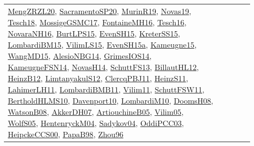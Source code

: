 {\begin{longtable}{lp{3cm}>{\raggedright}p{6cm}>{\raggedright}p{6cm}p{8cm}}
\href{articles/MengZRZL20.pdf}{MengZRZL20}\cite{MengZRZL20}, \href{articles/SacramentoSP20.pdf}{SacramentoSP20}\cite{SacramentoSP20}, \href{papers/MurinR19.pdf}{MurinR19}\cite{MurinR19}, \href{articles/Novas19.pdf}{Novas19}\cite{Novas19}, \href{papers/Tesch18.pdf}{Tesch18}\cite{Tesch18}, \href{papers/MossigeGSMC17.pdf}{MossigeGSMC17}\cite{MossigeGSMC17}, \href{papers/FontaineMH16.pdf}{FontaineMH16}\cite{FontaineMH16}, \href{papers/Tesch16.pdf}{Tesch16}\cite{Tesch16}, \href{articles/NovaraNH16.pdf}{NovaraNH16}\cite{NovaraNH16}, \href{papers/BurtLPS15.pdf}{BurtLPS15}\cite{BurtLPS15}, \href{papers/EvenSH15.pdf}{EvenSH15}\cite{EvenSH15}, \href{papers/KreterSS15.pdf}{KreterSS15}\cite{KreterSS15}, \href{papers/LombardiBM15.pdf}{LombardiBM15}\cite{LombardiBM15}, \href{papers/VilimLS15.pdf}{VilimLS15}\cite{VilimLS15}, \href{articles/EvenSH15a.pdf}{EvenSH15a}\cite{EvenSH15a}, \href{articles/Kameugne15.pdf}{Kameugne15}\cite{Kameugne15}, \href{articles/WangMD15.pdf}{WangMD15}\cite{WangMD15}, \href{papers/AlesioNBG14.pdf}{AlesioNBG14}\cite{AlesioNBG14}, \href{articles/GrimesIOS14.pdf}{GrimesIOS14}\cite{GrimesIOS14}, \href{articles/KameugneFSN14.pdf}{KameugneFSN14}\cite{KameugneFSN14}, \href{articles/NovasH14.pdf}{NovasH14}\cite{NovasH14}, \href{papers/SchuttFS13.pdf}{SchuttFS13}\cite{SchuttFS13}, \href{papers/BillautHL12.pdf}{BillautHL12}\cite{BillautHL12}, \href{papers/HeinzB12.pdf}{HeinzB12}\cite{HeinzB12}, \href{articles/LimtanyakulS12.pdf}{LimtanyakulS12}\cite{LimtanyakulS12}, \href{papers/ClercqPBJ11.pdf}{ClercqPBJ11}\cite{ClercqPBJ11}, \href{papers/HeinzS11.pdf}{HeinzS11}\cite{HeinzS11}, \href{papers/LahimerLH11.pdf}{LahimerLH11}\cite{LahimerLH11}, \href{papers/LombardiBMB11.pdf}{LombardiBMB11}\cite{LombardiBMB11}, \href{papers/Vilim11.pdf}{Vilim11}\cite{Vilim11}, \href{articles/SchuttFSW11.pdf}{SchuttFSW11}\cite{SchuttFSW11}, \href{papers/BertholdHLMS10.pdf}{BertholdHLMS10}\cite{BertholdHLMS10}, \href{papers/Davenport10.pdf}{Davenport10}\cite{Davenport10}, \href{papers/LombardiM10.pdf}{LombardiM10}\cite{LombardiM10}, \href{papers/DoomsH08.pdf}{DoomsH08}\cite{DoomsH08}, \href{papers/WatsonB08.pdf}{WatsonB08}\cite{WatsonB08}, \href{papers/AkkerDH07.pdf}{AkkerDH07}\cite{AkkerDH07}, \href{papers/ArtiouchineB05.pdf}{ArtiouchineB05}\cite{ArtiouchineB05}, \href{papers/Vilim05.pdf}{Vilim05}\cite{Vilim05}, \href{papers/WolfS05.pdf}{WolfS05}\cite{WolfS05}, \href{papers/HentenryckM04.pdf}{HentenryckM04}\cite{HentenryckM04}, \href{papers/Sadykov04.pdf}{Sadykov04}\cite{Sadykov04}, \href{papers/OddiPCC03.pdf}{OddiPCC03}\cite{OddiPCC03}, \href{articles/HeipckeCCS00.pdf}{HeipckeCCS00}\cite{HeipckeCCS00}, \href{articles/PapaB98.pdf}{PapaB98}\cite{PapaB98}, \href{papers/Zhou96.pdf}{Zhou96}\cite{Zhou96}\\

\end{longtable}}

